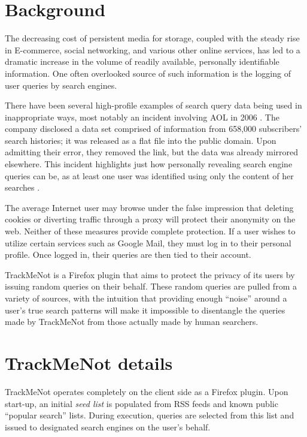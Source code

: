 \documentclass{llncs}
\begin{document}
\begin{multicols}{2}
\section{Background}
\label{sec:background}

The decreasing cost of persistent media for storage, coupled with the
steady rise in E-commerce, social networking, and various other online
services, has led to a dramatic increase in the volume of readily
available, personally identifiable information. One often overlooked
source of such information is the logging of user queries by search
engines.

There have been several high-profile examples of search query data
being used in inappropriate ways, most notably an incident involving
AOL in 2006 \cite{aol}. The company disclosed a data set comprised of
information from 658,000 subscribers' search histories; it was
released as a flat file into the public domain. Upon admitting their
error, they removed the link, but the data was already mirrored
elsewhere. This incident highlights just how personally revealing
search engine queries can be, as at least one user was identified
using only the content of her searches \cite{user4417749}.

The average Internet user may browse under the false impression that
deleting cookies or diverting traffic through a proxy will protect
their anonymity on the web. Neither of these measures provide complete
protection. If a user wishes to utilize certain services such as
Google Mail, they must log in to their personal profile. Once logged
in, their queries are then tied to their account.

TrackMeNot is a Firefox plugin that aims to protect the privacy of its
users by issuing random queries on their behalf. These random queries
are pulled from a variety of sources, with the intuition that
providing enough ``noise'' around a user's true search patterns will
make it impossible to disentangle the queries made by TrackMeNot from
those actually made by human searchers.

\section{TrackMeNot details}
\label{sec:tmn}
TrackMeNot operates completely on the client side as a Firefox
plugin. Upon start-up, an initial {\it seed list} is populated from
RSS feeds and known public ``popular search'' lists. During execution,
queries are selected from this list and issued to designated search engines
on the user's behalf.


\end{multicols}
\end{document}
